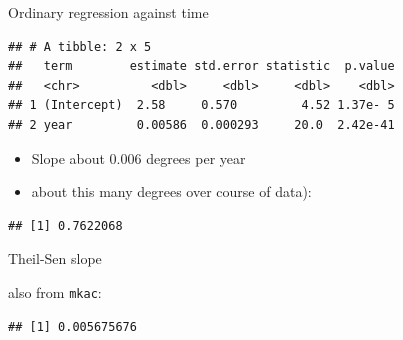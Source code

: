 \documentclass[
  ignorenonframetext,
]{beamer}
\newenvironment{Shaded}{\begin{snugshade}}{\end{snugshade}}
\newcommand{\DataTypeTok}[1]{\textcolor[rgb]{0.13,0.29,0.53}{#1}}
\newcommand{\DecValTok}[1]{\textcolor[rgb]{0.00,0.00,0.81}{#1}}
\newcommand{\KeywordTok}[1]{\textcolor[rgb]{0.13,0.29,0.53}{\textbf{#1}}}
\newcommand{\NormalTok}[1]{#1}
\newcommand{\OperatorTok}[1]{\textcolor[rgb]{0.81,0.36,0.00}{\textbf{#1}}}
\newcommand{\StringTok}[1]{\textcolor[rgb]{0.31,0.60,0.02}{#1}}
\providecommand{\tightlist}{%
  \setlength{\itemsep}{0pt}\setlength{\parskip}{0pt}}
\begin{document}
\begin{frame}[fragile]{Ordinary regression against time}
\protect\hypertarget{ordinary-regression-against-time}{}

\begin{Shaded}
\end{Shaded}

\begin{verbatim}
## # A tibble: 2 x 5
##   term        estimate std.error statistic  p.value
##   <chr>          <dbl>     <dbl>     <dbl>    <dbl>
## 1 (Intercept)  2.58     0.570         4.52 1.37e- 5
## 2 year         0.00586  0.000293     20.0  2.42e-41
\end{verbatim}

\begin{itemize}
\tightlist
\item
  Slope about 0.006 degrees per year
\item
  about this many degrees over course of data):
\end{itemize}

\begin{Shaded}
\end{Shaded}

\begin{verbatim}
## [1] 0.7622068
\end{verbatim}

\end{frame}

\begin{frame}[fragile]{Theil-Sen slope}
\protect\hypertarget{theil-sen-slope}{}

also from \texttt{mkac}:

\begin{Shaded}
\end{Shaded}

\begin{verbatim}
## [1] 0.005675676
\end{verbatim}

\end{frame}
\end{document}
